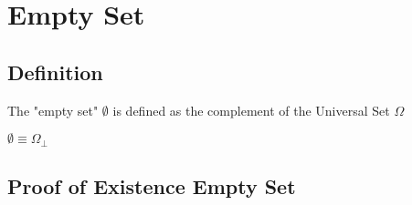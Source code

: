 \documentclass[11pt]{article}
\begin{document}
\section{Empty Set}
\subsection{Definition}

The "empty set" $\emptyset$ is defined as the complement of the Universal Set $\Omega$
\begin{center}
$
\emptyset \equiv \Omega_\perp
$
\end{center}

\subsection{Proof of Existence Empty Set}
\end{document}
